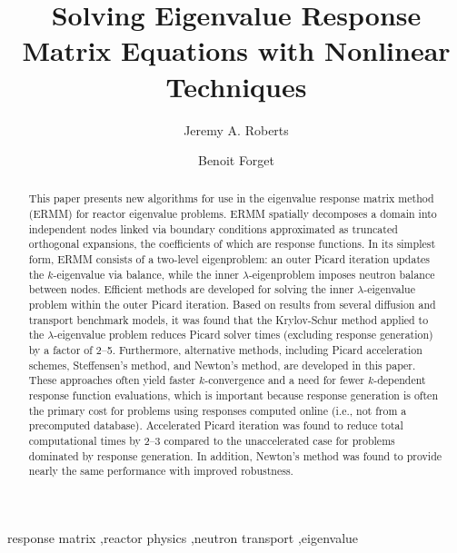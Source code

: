 \documentclass[preprint, 11pt]{elsarticle}
\begin{document}
\begin{frontmatter}

\title{Solving Eigenvalue Response Matrix Equations with 
       Nonlinear Techniques}


\author[label1]{Jeremy A. Roberts}
\author[label2]{Benoit Forget}
\address[label1]{Department of Mechanical and Nuclear Engineering,
                 Kansas State University, 3002 Rathbone Hall, Manhattan, KS 66506, USA}
\address[label2]{Department of Nuclear Science and Engineering, 
                 Massachusetts Institute of Technology,
                 77 Massachusetts Avenue, 24-107, Cambridge, MA 02139, USA}

\begin{abstract}

This paper presents new algorithms for use in the eigenvalue response matrix 
method (ERMM) for reactor eigenvalue problems.  ERMM spatially decomposes a
domain into independent nodes linked via boundary conditions approximated as 
truncated orthogonal expansions, the coefficients of which are response 
functions. In its simplest form, ERMM consists of a two-level eigenproblem: 
an outer Picard iteration updates the $k$-eigenvalue via balance,
while the inner $\lambda$-eigenproblem imposes neutron balance between nodes.  
Efficient methods are developed for solving the inner $\lambda$-eigenvalue 
problem within the outer Picard iteration. Based on results from  
several diffusion and transport benchmark models, it was found that 
the Krylov-Schur method applied to the $\lambda$-eigenvalue problem reduces 
Picard solver times (excluding response generation) by a factor of 2--5. 
Furthermore, alternative methods, including Picard acceleration schemes, 
Steffensen's method, and Newton's method, are developed in this paper.  
These approaches often yield faster $k$-convergence and a need for fewer 
$k$-dependent response function evaluations, which is important because 
response generation is often the primary cost for problems using responses 
computed online (i.e., not from a precomputed database). 
Accelerated Picard iteration was found to reduce total computational 
times by 2--3 compared to the unaccelerated case for problems dominated by 
response generation.  In addition, Newton's method was found to provide 
nearly the same performance with improved robustness.
\end{abstract}

\begin{keyword}

response matrix \sep reactor physics \sep neutron transport \sep eigenvalue
\end{keyword}

\end{frontmatter}






%
\end{document}
